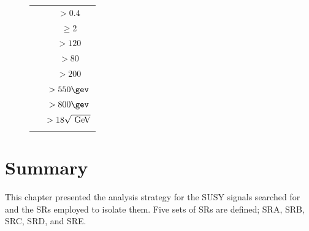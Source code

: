 \begin{figure}[!htb]
\begin{minipage}[!htb]{.5\textwidth}
\begin{tabular}{lc}
							   \toprule
							   \dphijetthreemet  & $>0.4$             \\ %
							   \nBJet   & $\geq$2            \\     %
							   \mantikteightzero & $>120$ \gev        \\     %
							   \mantikteightone  & $>80$ \gev         \\     %
							   \mtbmin\          & $>200$ \gev        \\     %
							   \met\             & $> 550 \gev$       \\     %
							   \HT               & $>800 \gev$        \\     %
							   \htsig            & $> 18 \sqrt{\GeV}$ \\     
							   \bottomrule
							   \label{tab:SignalRegionE}
							\end{tabular}
					\end{minipage}
				\end{figure}


	\section{Summary}


		This chapter presented the analysis strategy for the \ac{SUSY} signals searched for and the \acp{SR} employed to isolate them. Five sets of \acp{SR} are defined; SRA, SRB, SRC, SRD, and SRE. 

